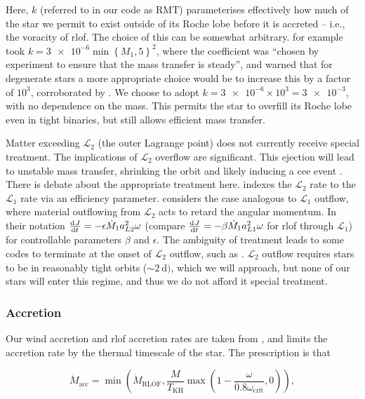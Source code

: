 Here, $k$ (referred to in our code as RMT) parameterises effectively how much of the star we permit to exist outside of its Roche lobe before it is accreted -- i.e., the voracity of \gls{rlof}. The choice of this can be somewhat arbitrary. \citet{Hurley:2002} for example took $k=\num{3e-6}\min\left\{M_1, 5\right\}^2$, where the coefficient was ``chosen by experiment to ensure that the mass transfer is steady'', and warned that for degenerate stars a more appropriate choice would be to increase this by a factor of $10^3$, corroborated by \citet{Claeys:2014}. We choose to adopt $k=\num{3e-6}\times10^3=\num{3e-3}$, with no dependence on the mass. This permits the star to overfill its Roche lobe even in tight binaries, but still allows efficient mass transfer.

Matter exceeding $\mathcal{L}_2$ (the outer Lagrange point) does not currently receive special treatment. The implications of $\mathcal{L}_2$ overflow are significant. This ejection will lead to unstable mass transfer, shrinking the orbit and likely inducing a \gls{cee} event \citep{Fragos:2023}. There is debate about the appropriate treatment here. \citet{Linial:2017} indexes the $\mathcal{L}_2$ rate to the $\mathcal{L}_1$ rate via an efficiency parameter. \citet{Li:2013} considers the case analogous to $\mathcal{L}_1$ outflow, where material outflowing from $\mathcal{L}_2$ acts to retard the angular momentum. In their notation $\dv{J}{t}=-\epsilon\dot{M}_1 a_{L2}^2\omega$ (compare $\dv{J}{t}=-\beta\dot{M}_1 a_{L1}^2\omega$ for \gls{rlof} through $\mathcal{L}_1$) for controllable parameters $\beta$ and $\epsilon$. The ambiguity of treatment leads to some codes to terminate at the onset of $\mathcal{L}_2$ outflow, such as  \citep{Fragos:2023}. $\mathcal{L}_2$ outflow requires stars to be in reasonably tight orbits ($\sim\SI{2}{\day})$, which we will approach, but none of our stars will enter this regime, and thus we do not afford it special treatment.

\subsubsection{Accretion}

Our wind accretion and \gls{rlof} accretion rates are taken from \citet{Bondi:1944, Hurley:2002}, and limits the accretion rate by the thermal timescale of the star. The prescription is that

\begin{equation}
    \dot{M}_\text{acc} = \min\left(\dot{M}_\text{RLOF}, \frac{M}{T_\text{KH}}\max\left(1-\frac{\omega}{0.8\omega_\text{crit}}, 0\right)\right),
\end{equation}

